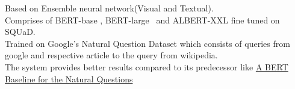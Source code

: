 \documentclass[a4paper]{deedy-resume-openfont}
\begin{document}
\begin{minipage}[t]{0.66\textwidth}
\textbullet{} Based on Ensemble neural network(Visual and Textual). \\
\textbullet{} Comprises of BERT-base , BERT-large \ and ALBERT-XXL fine tuned on SQUaD. \\
\textbullet{} Trained on Google's Natural Question Dataset which consists of queries from google and respective article to the query from wikipedia. \\
\textbullet{} The system provides better results compared to its predecessor like \href{https://arxiv.org/pdf/1901.08634.pdf}{{A BERT Baseline for the Natural Questions}}
\sectionsep






\end{minipage}
\end{document}
